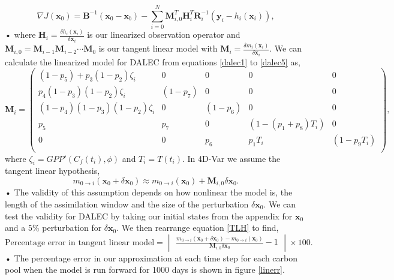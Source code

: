 \documentclass[11pt]{article}
\begin{document}
\begin{equation}
\nabla J(\textbf{x}_0) = \textbf{B}^{-1}(\textbf{x}_0-\textbf{x}_b)-\sum_{i=0}^{N}\textbf{M}_{i,0}^{T}\textbf{H}_i^{T}\textbf{R}_{i}^{-1}(\textbf{y}_i-h_i(\textbf{x}_i)),
\end{equation}•
where $\textbf{H}_i = \frac{\delta h_i(\textbf{x}_i)}{\delta\textbf{x}_i}$ is our linearized observation operator and $\mathbf{M}_{i,0}=\mathbf{M}_{i-1}\mathbf{M}_{i-2}\cdots\mathbf{M}_0$ is our tangent linear model with $\mathbf{M}_i=\frac{\delta m_{i}(\textbf{x}_{i})}{\delta \textbf{x}_{i}}$. We can calculate the linearized model for DALEC from equations \ref{dalec1} to \ref{dalec5} as,
\begin{equation}
\mathbf{M}_{i}= 
\begin{pmatrix} 
(1-p_5)+p_3(1-p_2)\zeta_i & 0 & 0 & 0 & 0 \\
p_4(1-p_3)(1-p_2)\zeta_i & (1-p_7) & 0 & 0 & 0 \\
(1-p_4)(1-p_3)(1-p_2)\zeta_i & 0 & (1-p_6) & 0 & 0 \\
p_5 & p_7 & 0 & (1-(p_1+p_8)T_i) & 0 \\
0 & 0 & p_6 & p_1T_i & (1-p_9T_i) \\
\end{pmatrix}, \label{linmod}
\end{equation}
where $\zeta_i = GPP'(C_f(t_i), \phi)$ and $T_{i}=T(t_i)$. In 4D-Var we assume the tangent linear hypothesis,
\begin{equation}
m_{0\rightarrow i}(\mathbf{x}_0+\delta\mathbf{x}_0) \approx m_{0 \rightarrow i}(\mathbf{x}_0) + \mathbf{M}_{i,0}\delta\mathbf{x}_0. \label{TLH}
\end{equation}•
The validity of this assumption depends on how nonlinear the model is, the length of the assimilation window and the size of the perturbation $\delta\mathbf{x}_0$. We can test the validity for DALEC by taking our initial states from the appendix for $\mathbf{x}_0$ and a $5\%$ perturbation for $\delta\mathbf{x}_0$. We then rearrange equation \ref{TLH} to find, 
\begin{equation}
\text{Percentage error in tangent linear model} = \begin{vmatrix} \frac{m_{0\rightarrow i}(\mathbf{x}_0+\delta\mathbf{x}_0) - m_{0 \rightarrow i}(\mathbf{x}_0)}{ \mathbf{M}_{i,0}\delta\mathbf{x}_0} - 1 \end{vmatrix} \times 100.
\end{equation}• 
The percentage error in our approximation at each time step for each carbon pool when the model is run forward for 1000 days is shown in figure \ref{linerr}.
\end{document}
